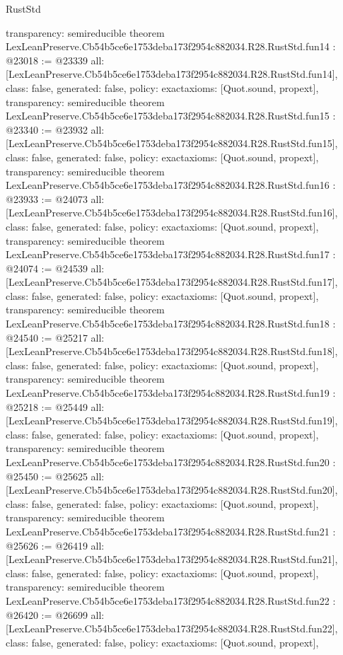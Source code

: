 \begin{lexlean}{RustStd}
\begin{coremodule}
{  transparency: semireducible
}
theorem LexLeanPreserve.Cb54b5ce6e1753deba173f2954c882034.R28.RustStd.fun14 : @23018 := @23339 {
  all: [LexLeanPreserve.Cb54b5ce6e1753deba173f2954c882034.R28.RustStd.fun14],
  class: false,
  generated: false,
  policy: exact{axioms: [Quot.sound, propext]},
  transparency: semireducible
}
theorem LexLeanPreserve.Cb54b5ce6e1753deba173f2954c882034.R28.RustStd.fun15 : @23340 := @23932 {
  all: [LexLeanPreserve.Cb54b5ce6e1753deba173f2954c882034.R28.RustStd.fun15],
  class: false,
  generated: false,
  policy: exact{axioms: [Quot.sound, propext]},
  transparency: semireducible
}
theorem LexLeanPreserve.Cb54b5ce6e1753deba173f2954c882034.R28.RustStd.fun16 : @23933 := @24073 {
  all: [LexLeanPreserve.Cb54b5ce6e1753deba173f2954c882034.R28.RustStd.fun16],
  class: false,
  generated: false,
  policy: exact{axioms: [Quot.sound, propext]},
  transparency: semireducible
}
theorem LexLeanPreserve.Cb54b5ce6e1753deba173f2954c882034.R28.RustStd.fun17 : @24074 := @24539 {
  all: [LexLeanPreserve.Cb54b5ce6e1753deba173f2954c882034.R28.RustStd.fun17],
  class: false,
  generated: false,
  policy: exact{axioms: [Quot.sound, propext]},
  transparency: semireducible
}
theorem LexLeanPreserve.Cb54b5ce6e1753deba173f2954c882034.R28.RustStd.fun18 : @24540 := @25217 {
  all: [LexLeanPreserve.Cb54b5ce6e1753deba173f2954c882034.R28.RustStd.fun18],
  class: false,
  generated: false,
  policy: exact{axioms: [Quot.sound, propext]},
  transparency: semireducible
}
theorem LexLeanPreserve.Cb54b5ce6e1753deba173f2954c882034.R28.RustStd.fun19 : @25218 := @25449 {
  all: [LexLeanPreserve.Cb54b5ce6e1753deba173f2954c882034.R28.RustStd.fun19],
  class: false,
  generated: false,
  policy: exact{axioms: [Quot.sound, propext]},
  transparency: semireducible
}
theorem LexLeanPreserve.Cb54b5ce6e1753deba173f2954c882034.R28.RustStd.fun20 : @25450 := @25625 {
  all: [LexLeanPreserve.Cb54b5ce6e1753deba173f2954c882034.R28.RustStd.fun20],
  class: false,
  generated: false,
  policy: exact{axioms: [Quot.sound, propext]},
  transparency: semireducible
}
theorem LexLeanPreserve.Cb54b5ce6e1753deba173f2954c882034.R28.RustStd.fun21 : @25626 := @26419 {
  all: [LexLeanPreserve.Cb54b5ce6e1753deba173f2954c882034.R28.RustStd.fun21],
  class: false,
  generated: false,
  policy: exact{axioms: [Quot.sound, propext]},
  transparency: semireducible
}
theorem LexLeanPreserve.Cb54b5ce6e1753deba173f2954c882034.R28.RustStd.fun22 : @26420 := @26699 {
  all: [LexLeanPreserve.Cb54b5ce6e1753deba173f2954c882034.R28.RustStd.fun22],
  class: false,
  generated: false,
  policy: exact{axioms: [Quot.sound, propext]},
}
\end{coremodule}
\end{lexlean}
